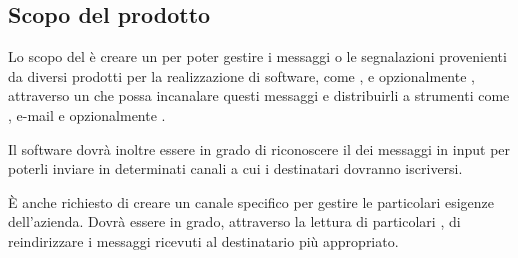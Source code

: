 \subsection{Scopo del prodotto}



Lo scopo del  è creare un  per poter gestire i messaggi o le segnalazioni provenienti da diversi prodotti per la realizzazione di software,
come ,  e opzionalmente , attraverso un  che possa incanalare questi messaggi e distribuirli a strumenti come
, e-mail e opzionalmente .\par
Il software dovrà inoltre essere in grado di riconoscere il  dei messaggi in input per poterli inviare in determinati canali a cui i
destinatari dovranno iscriversi.\par
\`E anche richiesto di creare un canale specifico per gestire le particolari esigenze dell'azienda. Dovrà essere in grado, attraverso la lettura di
particolari	, di reindirizzare i messaggi ricevuti al destinatario più appropriato.



